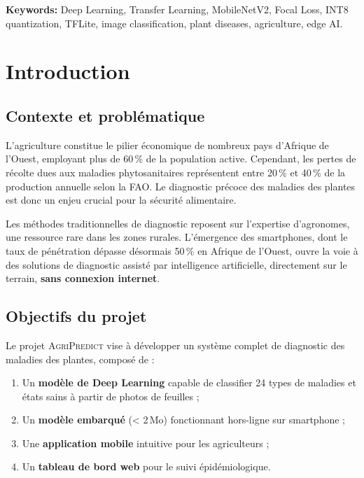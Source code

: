 \documentclass[12pt, a4paper, twoside]{report}
\newcommand{\agri}{\textsc{AgriPredict}}
\begin{document}
\textbf{Keywords:} Deep Learning, Transfer Learning, MobileNetV2, Focal Loss, INT8 quantization, TFLite, image classification, plant diseases, agriculture, edge AI.

\tableofcontents
\listoffigures
\listoftables

\cleardoublepage
{}

\chapter{Introduction}

\section{Contexte et problématique}

L'agriculture constitue le pilier économique de nombreux pays d'Afrique de l'Ouest, employant plus de 60\,\% de la population active. Cependant, les pertes de récolte dues aux maladies phytosanitaires représentent entre 20\,\% et 40\,\% de la production annuelle selon la FAO. Le diagnostic précoce des maladies des plantes est donc un enjeu crucial pour la sécurité alimentaire.

Les méthodes traditionnelles de diagnostic reposent sur l'expertise d'agronomes, une ressource rare dans les zones rurales. L'émergence des smartphones, dont le taux de pénétration dépasse désormais 50\,\% en Afrique de l'Ouest, ouvre la voie à des solutions de diagnostic assisté par intelligence artificielle, directement sur le terrain, \textbf{sans connexion internet}.

\section{Objectifs du projet}

Le projet \agri{} vise à développer un système complet de diagnostic des maladies des plantes, composé de :
\begin{enumerate}
    \item Un \textbf{modèle de Deep Learning} capable de classifier 24 types de maladies et états sains à partir de photos de feuilles ;
    \item Un \textbf{modèle embarqué} (< 2\,Mo) fonctionnant hors-ligne sur smartphone ;
    \item Une \textbf{application mobile} intuitive pour les agriculteurs ;
    \item Un \textbf{tableau de bord web} pour le suivi épidémiologique.
\end{enumerate}
\end{document}
